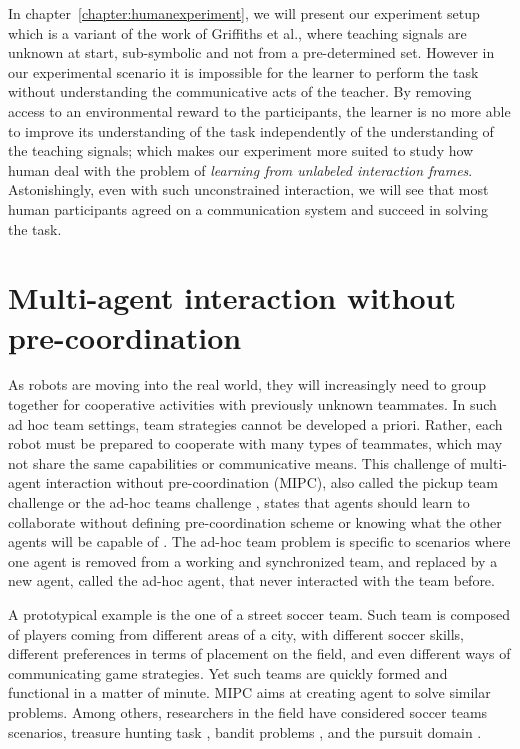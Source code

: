 In chapter~\ref{chapter:humanexperiment}, we will present our experiment setup which is a variant of the work of Griffiths et al., where teaching signals are unknown at start, sub-symbolic and not from a pre-determined set. However in our experimental scenario it is impossible for the learner to perform the task without understanding the communicative acts of the teacher. By removing access to an environmental reward to the participants, the learner is no more able to improve its understanding of the task independently of the understanding of the teaching signals; which makes our experiment more suited to study how human deal with the problem of \emph{learning from unlabeled interaction frames}. Astonishingly, even with such unconstrained interaction, we will see that most human participants agreed on a communication system and succeed in solving the task.

\section{Multi-agent interaction without pre-coordination}

As robots are moving into the real world, they will increasingly need to group together for cooperative activities with previously unknown teammates. In such ad hoc team settings, team strategies cannot be developed a priori. Rather, each robot must be prepared to cooperate with many types of teammates, which may not share the same capabilities or communicative means. This challenge of multi-agent interaction without pre-coordination (MIPC), also called the pickup team challenge \cite{gil2006dynamically} or the ad-hoc teams challenge \cite{stone2010ad}, states that agents should learn to collaborate without defining pre-coordination scheme or knowing what the other agents will be capable of \cite{bowling2005coordination,gil2006dynamically,stone2010ad}. The ad-hoc team problem \cite{stone2010ad} is specific to scenarios where one agent is removed from a working and synchronized team, and replaced by a new agent, called the ad-hoc agent, that never interacted with the team before.

A prototypical example is the one of a street soccer team. Such team is composed of players coming from different areas of a city, with different soccer skills, different preferences in terms of placement on the field, and even different ways of communicating game strategies. Yet such teams are quickly formed and functional in a matter of minute. MIPC aims at creating agent to solve similar problems. Among others, researchers in the field have considered soccer teams scenarios\cite{bowling2005coordination}, treasure hunting task \cite{gil2006dynamically}, bandit problems \cite{barrett2013communicating}, and the pursuit domain \cite{barrett2011empirical}.

